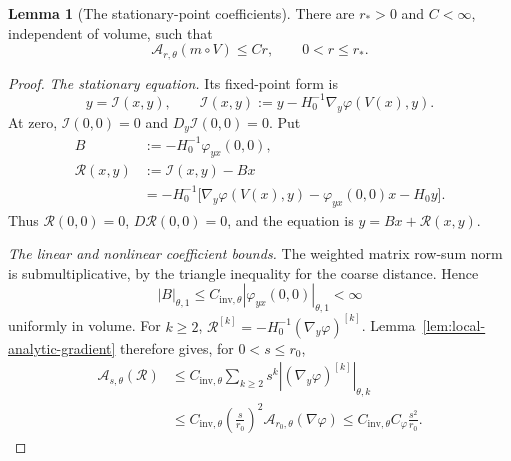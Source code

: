 \documentclass[10pt,reqno]{amsart}
\theoremstyle{definition}
\newtheorem{lemma}[definition]{Lemma}
\theoremstyle{remark}
\numberwithin{equation}{section}
\numberwithin{figure}{section}
\begin{document}
\begin{lemma}[The stationary-point coefficients]\label{lem:stationary-analytic-coefficients}
There are $r_*>0$ and $C<\infty$, independent of volume, such that
\begin{equation}\label{eq:stationary-point-analytic-coefficient-bound}
\mathcal A_{r,\theta}(m\circ V)\le Cr,\qquad 0<r\le r_*.
\end{equation}
\end{lemma}
\begin{proof}
\emph{The stationary equation.} Its fixed-point form is
\begin{equation}\label{eq:analytic-stationary-fixed-point-map}
y=\mathcal I(x,y),\qquad
\mathcal I(x,y):=y-H_0^{-1}\nabla_y\varphi(V(x),y).
\end{equation}
At zero, $\mathcal I(0,0)=0$ and $D_y\mathcal I(0,0)=0$.
Put
\begin{equation}\label{eq:analytic-stationary-linear-remainder}
\begin{aligned}
B&:=-H_0^{-1}\varphi_{yx}(0,0),\\
\mathcal R(x,y)&:=\mathcal I(x,y)-Bx\\
&=-H_0^{-1}\bigl[\nabla_y\varphi(V(x),y)
-\varphi_{yx}(0,0)x-H_0y\bigr].
\end{aligned}
\end{equation}
Thus $\mathcal R(0,0)=0$, $D\mathcal R(0,0)=0$, and the equation is
$y=Bx+\mathcal R(x,y)$.

\emph{The linear and nonlinear coefficient bounds.} The weighted
matrix row-sum norm is submultiplicative, by the triangle inequality
for the coarse distance. Hence
\begin{equation}\label{eq:analytic-stationary-linear-bound}
|B|_{\theta,1}
\le C_{\mathrm{inv},\theta}
|\varphi_{yx}(0,0)|_{\theta,1}<\infty
\end{equation}
uniformly in volume. For $k\ge2$,
$\mathcal R^{[k]}=-H_0^{-1}(\nabla_y\varphi)^{[k]}$.
Lemma~\ref{lem:local-analytic-gradient} therefore gives, for
$0<s\le r_0$,
\begin{equation}\label{eq:analytic-stationary-remainder-bound}
\begin{aligned}
\mathcal A_{s,\theta}(\mathcal R)
&\le C_{\mathrm{inv},\theta}
\sum_{k\ge2}s^k|(\nabla_y\varphi)^{[k]}|_{\theta,k}\\
&\le C_{\mathrm{inv},\theta}\left(\frac{s}{r_0}\right)^2
\mathcal A_{r_0,\theta}(\nabla\varphi)
\le C_{\mathrm{inv},\theta}C_\varphi\frac{s^2}{r_0}.
\end{aligned}
\end{equation}


\end{proof}
\end{document}
